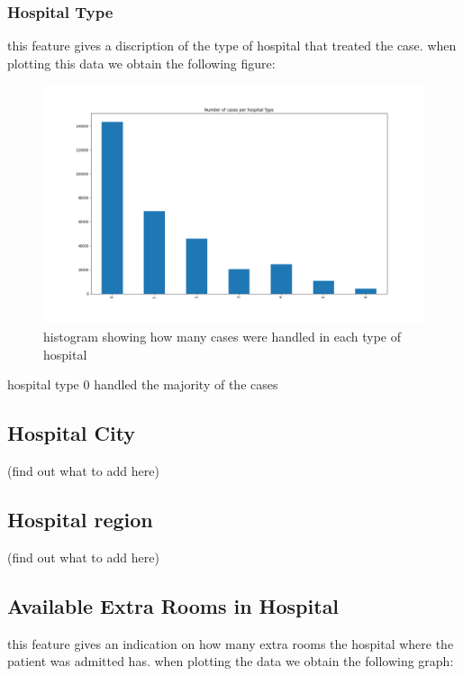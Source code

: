 \documentclass[fleqn]{article}
\begin{document}
		\subsubsection*{Hospital Type}
			this feature gives a discription of the type of hospital that treated 					the case. when plotting this data we obtain the following figure: \\
			\begin{figure}[hb]
  				\includegraphics[width=\linewidth]{hospitalType_hist.png}
  				\caption{histogram showing how many cases were handled in each type 						of hospital}
  				\label{fig:4}
			\end{figure} 
			\FloatBarrier
			
			hospital type 0 handled the majority of the cases
			
		\subsection*{Hospital City}
		(find out what to add here)
		
		\subsection*{Hospital region}
		(find out what to add here)
		
		\subsection*{Available Extra Rooms in Hospital}
			this feature gives an indication on how many extra rooms the hospital 					where the patient was admitted has. when plotting the data we obtain the 			following graph:
			
\end{document}
